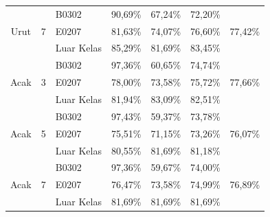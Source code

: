 \begin{enumerate}[a.]
\begin{enumerate}[a.]
\begin{enumerate}
\begin{table}[H]
\begin{tabular}{|c|c|l|c|c|c|c|}
			      \multirow{3}{*}{Urut} & \multirow{3}{*}{7} & B0302                            & 90,69\%   & 67,24\% & 72,20\%   & \multirow{3}{*}{77,42\%} \\ \cline{3-6}
			                            &                    & E0207                            & 81,63\%   & 74,07\% & 76,60\%   &                          \\ \cline{3-6}
			                            &                    & Luar Kelas                       & 85,29\%   & 81,69\% & 83,45\%   &                          \\ \hline
			      \multirow{3}{*}{Acak} & \multirow{3}{*}{3} & B0302                            & 97,36\%   & 60,65\% & 74,74\%   & \multirow{3}{*}{77,66\%} \\ \cline{3-6}
			                            &                    & E0207                            & 78,00\%   & 73,58\% & 75,72\%   &                          \\ \cline{3-6}
			                            &                    & Luar Kelas                       & 81,94\%   & 83,09\% & 82,51\%   &                          \\ \hline
			      \multirow{3}{*}{Acak} & \multirow{3}{*}{5} & B0302                            & 97,43\%   & 59,37\% & 73,78\%   & \multirow{3}{*}{76,07\%} \\ \cline{3-6}
			                            &                    & E0207                            & 75,51\%   & 71,15\% & 73,26\%   &                          \\ \cline{3-6}
			                            &                    & Luar Kelas                       & 80,55\%   & 81,69\% & 81,18\%   &                          \\ \hline
			      \multirow{3}{*}{Acak} & \multirow{3}{*}{7} & B0302                            & 97,36\%   & 59,67\% & 74,00\%   & \multirow{3}{*}{76,89\%} \\ \cline{3-6}
			                            &                    & E0207                            & 76,47\%   & 73,58\% & 74,99\%   &                          \\ \cline{3-6}
			                            &                    & Luar Kelas                       & 81,69\%   & 81,69\% & 81,69\%   &                          \\ \hline
		      \end{tabular}
	      \end{table}



\end{enumerate}
\end{enumerate}
\end{enumerate}
